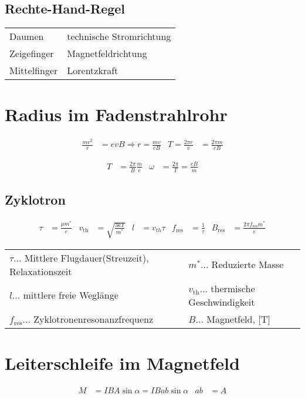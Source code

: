 		\subsection{Rechte-Hand-Regel}
			\begin{tabularx}{\textwidth}{l l}
				Daumen & technische Stromrichtung\\
				Zeigefinger & Magnetfeldrichtung\\
				Mittelfinger & Lorentzkraft\\
			\end{tabularx}
	
	\section{Radius im Fadenstrahlrohr}
		\begin{align*}
			\frac{mv^2}{r}&= evB \Rightarrow r = \frac{mv}{eB} & T= \frac{2\pi r}{v} &= \frac{2\pi m}{eB}
		\end{align*}

		\begin{align*}
			T &= \frac{2\pi}{B}\frac{m}{e} & \omega &= \frac{2\pi}{T}=\frac{eB}{m}
		\end{align*}

		\subsection{Zyklotron}
			\begin{align*}
				\tau &= \frac{\mu m^*}{e} 
				& v_\text{{th}} &= \sqrt{\frac{3kT}{m^*}} 
				& l &= v_{th}\tau 
				& f_{\text{res}} &= \frac{1}{\tau} 
				& B_{\text{res}} &= \frac{2\pi f_{\text{res}} m^*}{e}
			\end{align*}

			\begin{table}[h]
			\begin{tabular}{ll}
			$\tau\dots$ Mittlere Flugdauer(Streuzeit), Relaxationszeit & $m^*\dots$ Reduzierte Masse\\
			$l\dots$ mittlere freie Weglänge & $v_{\text{th}}\dots$ thermische Geschwindigkeit \\
			$f_{\text{res}}\dots$ Zyklotronenresonanzfrequenz & $B\dots$ Magnetfeld, [T]\\
			\end{tabular}
			\end{table}

	\section{Leiterschleife im Magnetfeld}
		\begin{align*}
			M&=IBA\sin\alpha=IBab\sin\alpha & ab&=A
		\end{align*}

